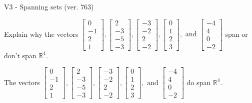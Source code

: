 \begin{exercise}
  \begin{exerciseTitle}V3 - Spanning sets (ver. 763)\end{exerciseTitle}
  \begin{exerciseStatement}
    Explain why the vectors \(\left[\begin{array}{r}
0 \\
-1 \\
2 \\
1
\end{array}\right] , \left[\begin{array}{r}
2 \\
-3 \\
-5 \\
-3
\end{array}\right] , \left[\begin{array}{r}
-3 \\
-2 \\
2 \\
-2
\end{array}\right] , \left[\begin{array}{r}
0 \\
1 \\
2 \\
3
\end{array}\right] , \text{ and } \left[\begin{array}{r}
-4 \\
4 \\
0 \\
-2
\end{array}\right]\) span or don't span \(\mathbb{R}^4\). 
	


  \end{exerciseStatement}
  \begin{exerciseAnswer}
   The vectors \(\left[\begin{array}{r}
0 \\
-1 \\
2 \\
1
\end{array}\right] , \left[\begin{array}{r}
2 \\
-3 \\
-5 \\
-3
\end{array}\right] , \left[\begin{array}{r}
-3 \\
-2 \\
2 \\
-2
\end{array}\right] , \left[\begin{array}{r}
0 \\
1 \\
2 \\
3
\end{array}\right] , \text{ and } \left[\begin{array}{r}
-4 \\
4 \\
0 \\
-2
\end{array}\right]\) 
  	 do  
	span \(\mathbb{R}^4\).
  



\end{exerciseAnswer}
\end{exercise}
